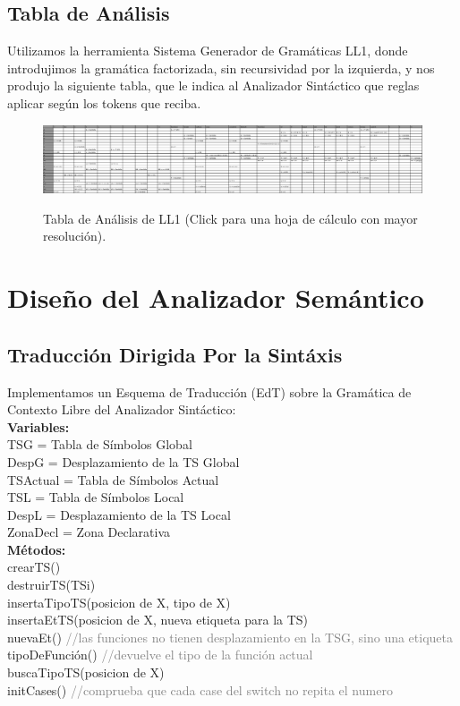 \documentclass{article}[a4paper]
\newcommand\tab[1][1cm]{\hspace*{#1}}
\begin{document}
\subsection{Tabla de Análisis}
Utilizamos la herramienta Sistema Generador de Gramáticas LL1, donde introdujimos la gramática factorizada, sin recursividad por la izquierda, y nos produjo la siguiente tabla, que le indica al Analizador Sintáctico que reglas aplicar según los tokens que reciba.
\begin{figure}[h!]
\centering
\href{https://docs.google.com/spreadsheets/d/17yF_afvRGqVFFo7q70U3LPK74hVvpB8d/edit#gid=2045406742}{\includegraphics[width=1\textwidth]{tablaM.png}}
\caption{\label{figura:tablaM}Tabla de Análisis de LL1 (Click para una hoja de cálculo con mayor resolución).}
\end{figure}

\newpage

\section{Diseño del Analizador Semántico}

\subsection{Traducción Dirigida Por la Sintáxis}
Implementamos un Esquema de Traducción (EdT) sobre la Gramática de Contexto Libre del Analizador Sintáctico:\\

\noindent\textbf{Variables:}\\
\tab TSG = Tabla de Símbolos Global\\
\tab DespG = Desplazamiento de la TS Global\\
\tab TSActual = Tabla de Símbolos Actual\\
\tab TSL = Tabla de Símbolos Local\\
\tab DespL = Desplazamiento de la TS Local\\
\tab ZonaDecl = Zona Declarativa\\

\noindent\textbf{Métodos:}\\
\tab crearTS()\\
\tab destruirTS(TSi)\\
\tab insertaTipoTS(posicion de X, tipo de X)\\
\tab insertaEtTS(posicion de X, nueva etiqueta para la TS)\\
\tab nuevaEt() \textcolor{gray}{//las funciones no tienen desplazamiento en la TSG, sino una etiqueta}\\
\tab tipoDeFunción() \textcolor{gray}{//devuelve el tipo de la función actual}\\
\tab buscaTipoTS(posicion de X)\\
\tab initCases() \textcolor{gray}{//comprueba que cada case del switch no repita el numero}\\
\end{document}
